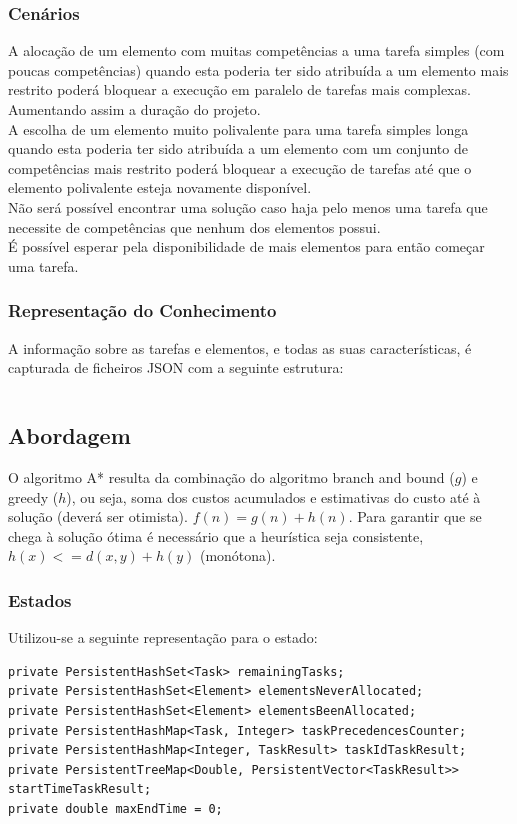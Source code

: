 \documentclass[a4paper,11pt]{article}
\begin{document}
\subsubsection{Cenários}

A alocação de um elemento com muitas competências a uma tarefa simples (com poucas competências) quando esta poderia ter sido atribuída a um elemento mais restrito poderá bloquear a execução em paralelo de tarefas mais complexas. Aumentando assim a duração do projeto.\\

A escolha de um elemento muito polivalente para uma tarefa simples longa quando esta poderia ter sido atribuída a um elemento com um conjunto de competências mais restrito poderá bloquear a execução de tarefas até que o elemento polivalente esteja novamente disponível.\\

Não será possível encontrar uma solução caso haja pelo menos uma tarefa que necessite de competências que nenhum dos elementos possui.\\

É possível esperar pela disponibilidade de mais elementos para então começar uma tarefa.

\subsubsection{Representação do Conhecimento}

A informação sobre as tarefas e elementos, e todas as suas características, é capturada de ficheiros JSON com a seguinte estrutura:

\begingroup
\inputminted[breaklines=false,fontsize=\footnotesize]{json}{exemplo_input.json}
\captionsetup{type=figure}
\endgroup
\subsection{Abordagem}

O algoritmo A* resulta da combinação do algoritmo branch and bound ($g$) e greedy ($h$), ou seja, soma dos custos acumulados e estimativas do custo até à solução (deverá ser otimista). $f(n) = g(n) + h(n)$. Para garantir que se chega à solução ótima é necessário que a heurística seja consistente, $h(x) <= d(x, y) + h(y)$ (monótona).

\subsubsection{Estados}
Utilizou-se a seguinte representação para o estado:
\begin{verbatim}
private PersistentHashSet<Task> remainingTasks;
private PersistentHashSet<Element> elementsNeverAllocated;
private PersistentHashSet<Element> elementsBeenAllocated;
private PersistentHashMap<Task, Integer> taskPrecedencesCounter;
private PersistentHashMap<Integer, TaskResult> taskIdTaskResult;
private PersistentTreeMap<Double, PersistentVector<TaskResult>> startTimeTaskResult;
private double maxEndTime = 0;
\end{verbatim}
\end{document}
